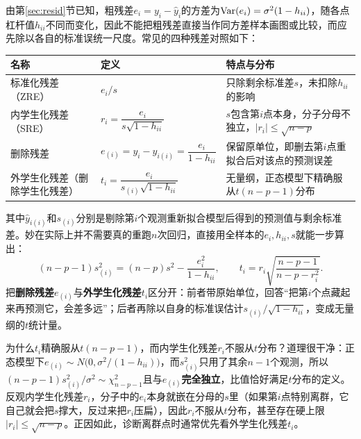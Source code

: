 由第\ref{sec:resid}节已知，粗残差$e_i=y_i-\widehat y_i$的方差为$\operatorname{Var}(e_i)=\sigma^2(1-h_{ii})$，随各点杠杆值$h_{ii}$不同而变化，因此不能把粗残差直接当作同方差样本画图或比较，而应先除以各自的标准误统一尺度。常见的四种残差对照如下：
\begin{center}\small\renewcommand{\arraystretch}{1.6}\begin{tabular}{>{\raggedright\arraybackslash}p{3.4cm}>{\centering\arraybackslash}p{4.6cm}>{\raggedright\arraybackslash}p{5.2cm}}
\toprule 名称&定义&特点与分布\\\midrule
标准化残差（ZRE）&$e_i/s$&只除剩余标准差$s$，未扣除$h_{ii}$的影响\\
内学生化残差（SRE）&$r_i=\dfrac{e_i}{s\sqrt{1-h_{ii}}}$&$s$包含第$i$点本身，分子分母不独立，$|r_i|\le\sqrt{n-p}$\\
删除残差&$e_{(i)}=y_i-\widehat y_{i(i)}=\dfrac{e_i}{1-h_{ii}}$&保留原单位，即删去第$i$点重拟合后对该点的预测误差\\
外学生化残差（删除学生化残差）&$t_i=\dfrac{e_i}{s_{(i)}\sqrt{1-h_{ii}}}$&无量纲，正态模型下精确服从$t(n-p-1)$分布\\\bottomrule
\end{tabular}\end{center}
其中$\widehat y_{i(i)}$和$s_{(i)}$分别是剔除第$i$个观测重新拟合模型后得到的预测值与剩余标准差。妙在实际上并不需要真的重跑$n$次回归，直接用全样本的$e_i,h_{ii},s$就能一步算出：
\[
(n-p-1)s_{(i)}^2=(n-p)s^2-\frac{e_i^2}{1-h_{ii}},\qquad
t_i=r_i\sqrt{\frac{n-p-1}{n-p-r_i^2}} .
\]
把\textbf{删除残差}$e_{(i)}$与\textbf{外学生化残差}$t_i$区分开：前者带原始单位，回答“把第$i$个点藏起来再预测它，会差多远”；后者再除以自身的标准误估计$s_{(i)}/\sqrt{1-h_{ii}}$，变成无量纲的$t$统计量。

为什么$t_i$精确服从$t(n-p-1)$，而内学生化残差$r_i$不服从$t$分布？道理很干净：正态模型下$e_{(i)}\sim N\bigl(0,\sigma^2/(1-h_{ii})\bigr)$，而$s_{(i)}^2$只用了其余$n-1$个观测，所以$(n-p-1)s_{(i)}^2/\sigma^2\sim\chi^2_{n-p-1}$且与$e_{(i)}$\textbf{完全独立}，比值恰好满足$t$分布的定义。反观内学生化残差$r_i$，分子中的$e_i$本身就嵌在分母的$s$里（如果第$i$点特别离群，它自己就会把$s$撑大，反过来把$r_i$压扁），因此$r_i$不服从$t$分布，甚至存在硬上限$|r_i|\le\sqrt{n-p}$。正因如此，诊断离群点时通常优先看外学生化残差$t_i$。

